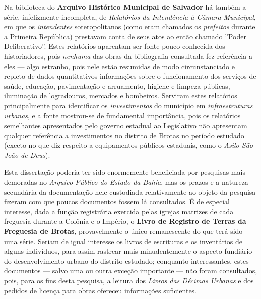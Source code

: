 Na biblioteca do \textbf{Arquivo Histórico Municipal de Salvador} há também a série, infelizmente incompleta, de \textit{Relatórios da Intendência à Câmara Municipal}, em que os \textit{intendentes} soteropolitanos (como eram chamados os \textit{prefeitos} durante a Primeira República) prestavam conta de seus atos ao então chamado ''Poder Deliberativo''. Estes relatórios aparentam ser fonte pouco conhecida dos historiadores, pois \textit{nenhuma} das obras da bibliografia consultada fez referência a eles --- algo estranho, pois nele estão resumidas de modo circunstanciado e repleto de dados quantitativos informações sobre o funcionamento dos serviços de saúde, educação, pavimentação e arruamento, higiene e limpeza públicas, iluminação de logradouros, mercados e bombeiros. Serviram estes relatórios principalmente para identificar os \textit{investimentos} do município em \textit{infraestruturas urbanas}, e a fonte mostrou-se de fundamental importância, pois os relatórios semelhantes apresentados pelo governo estadual ao Legislativo não apresentam qualquer referência a investimentos no distrito de Brotas no período estudado (exceto no que diz respeito a equipamentos públicos estaduais, como o \textit{Asilo São João de Deus}).

Esta dissertação poderia ter sido enormemente beneficiada por pesquisas mais demoradas no \textit{Arquivo Público do Estado da Bahia}, mas os prazos e a natureza secundária da documentação nele custodiada relativamente ao objeto da pesquisa fizeram com que poucos documentos fossem lá consultados. É de especial interesse, dada a função registrária exercida pelas igrejas matrizes de cada freguesia durante a Colônia e o Império, o \textbf{Livro de Registro de Terras da Freguesia de Brotas}, provavelmente o único remanescente do que terá sido uma série. Seriam de igual interesse os livros de escrituras e os inventários de alguns indivíduos, para assim rastrear mais minudentemente o aspecto fundiário do desenvolvimento urbano do distrito estudado; conquanto interessantes, estes documentos --- salvo uma ou outra exceção importante --- não foram consultados, pois, para os fins desta pesquisa, a leitura dos \textit{Livros das Décimas Urbanas} e dos pedidos de licença para obras ofereceu informações suficientes.

